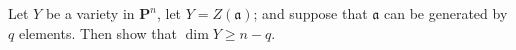 Let $Y$ be a variety in $\mathbf{P}^n$, let $Y = Z(\mathfrak{a})$; and suppose that $\mathfrak{a}$ can be generated by $q$ elements. Then show that $\dim Y \geq n - q$.
